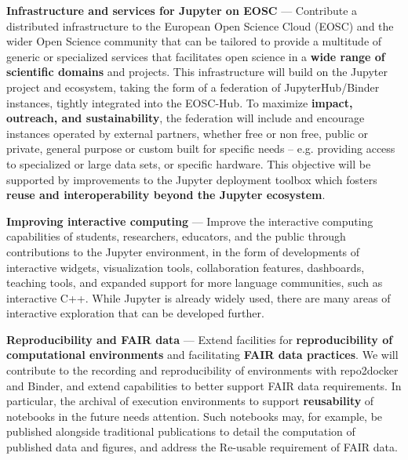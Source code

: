 \begin{compactenum}

\item \label{obj:deployment}
  \textbf{Infrastructure and services for Jupyter on EOSC} ---
  Contribute a distributed infrastructure to the European Open Science Cloud
  (EOSC) and the wider Open Science community that can be tailored to
  provide a multitude of generic or specialized services that facilitates
  open science in a \textbf{wide range of scientific domains} and projects.
  This infrastructure will build on the Jupyter project and ecosystem,
  taking the form of a federation of JupyterHub/Binder instances,
  tightly integrated into the EOSC-Hub.
  To maximize \textbf{impact, outreach, and sustainability},
  the federation will include and encourage instances operated by
  external partners, whether free or non free, public or private,
  general purpose or custom built for specific needs -- e.g.
  providing access to specialized or large data sets, or specific hardware.
  This objective will be supported by improvements to the Jupyter
  deployment toolbox which fosters \textbf{reuse and interoperability
    beyond the Jupyter ecosystem}.

\item \label{obj:interactivity}
  \textbf{Improving interactive computing} ---
  Improve the interactive computing capabilities of
  students, researchers, educators, and the public
  through contributions to the Jupyter environment,
  in the form of developments of interactive widgets,
  visualization tools, collaboration features, dashboards,
  teaching tools,
  and expanded support for more language communities,
  such as interactive C++.
  While Jupyter is already widely used,
  there are many areas
  of interactive exploration that can be developed further.

\item \label{obj:reusability}
  \textbf{Reproducibility and FAIR data} ---
  Extend facilities for
  \textbf{reproducibility of computational environments}
  and facilitating \textbf{FAIR data practices}.
  We will contribute to the recording and reproducibility
  of environments with repo2docker and Binder,
  and extend capabilities to better support FAIR
  data requirements. In particular, the archival of execution
  environments to support \textbf{reusability} of notebooks in the future
  needs attention. Such notebooks may, for example, be published alongside
  traditional publications to detail the computation of published data
  and figures, and address the Re-usable requirement of FAIR data.


\end{compactenum}
